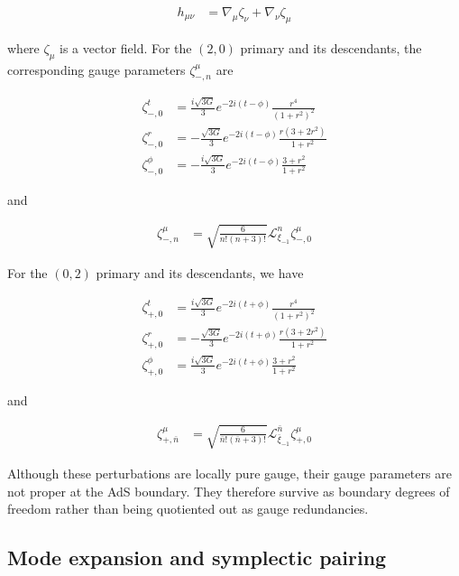 \begin{align}
h_{\mu \nu} & =\nabla _{\mu}\zeta _{\nu}+\nabla _{\nu}\zeta _{\mu}
\end{align}

where \(\zeta _{\mu}\) is a vector field. For the \((2,0)\) primary and its descendants, the corresponding gauge parameters \(\zeta _{-,n}^{\mu}\) are

\begin{align}
\zeta _{-,0}^{t} & =\frac{i\sqrt{ 3G }}{3} e^{-2i(t-\phi)} \frac{r^{4}}{(1+r^{2})^{2}} \\
\zeta _{-,0}^{r} & =-\frac{\sqrt{ 3G }}{3}e^{-2i(t-\phi)}  \frac{r(3+2r^{2})}{1+r^{2}} \\
\zeta _{-,0}^{\phi} & =-\frac{i\sqrt{ 3G }}{3}e^{-2i(t-\phi)} \frac{3+r^{2}}{1+r^{2}}
\end{align}

and

\begin{align}
\zeta ^{\mu}_{-,n} & =\sqrt{ \frac{6}{n!(n+3)!} }\mathcal{L}_{\xi _{-1}}^{n}\zeta _{-,0}^{\mu}
\end{align}

For the \((0,2)\) primary and its descendants, we have

\begin{align}
\zeta ^{t}_{+,0} & =\frac{i\sqrt{ 3G }}{3}e^{-2i(t+\phi)} \frac{r^{4}}{(1+r^{2})^{2}} \\
\zeta ^{r}_{+,0} & =-\frac{\sqrt{ 3G }}{3}e^{-2i(t+\phi)} \frac{r(3+2r^{2})}{1+r^{2}} \\
\zeta ^{\phi}_{+,0} & =\frac{i\sqrt{ 3G }}{3}e^{-2i(t+\phi)} \frac{3+r^{2}}{1+r^{2}}
\end{align}

and

\begin{align}
\zeta ^{\mu}_{+,\bar{n}} & =\sqrt{ \frac{6}{\bar{n}!(\bar{n}+3)!} }\mathcal{L}_{\bar{\xi}_{-1}}^{\bar{n}}\zeta _{+,0}^{\mu}
\end{align}

Although these perturbations are locally pure gauge, their gauge parameters are not proper at the AdS boundary. They therefore survive as boundary degrees of freedom rather than being quotiented out as gauge redundancies.

\subsection{Mode expansion and symplectic pairing}\label{mode-expansion-and-symplectic-pairing}

